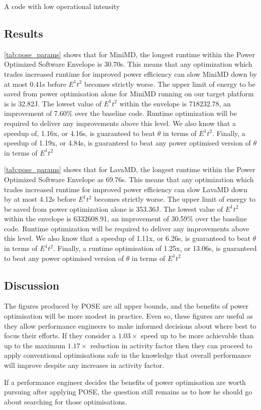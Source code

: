 A code with low operational intensity

\subsection{Results}

\autoref{tab:pose_params}  shows that for MiniMD, the longest runtime within the Power Optimized Software Envelope is 30.70s.
This means that any optimization which trades increased runtime for improved power efficiency can slow MiniMD down by at most 0.41s before $E^1t^2$ becomes strictly worse.
The upper limit of energy to be saved from power optimisation alone for MiniMD running on our target platform is is 32.82J.
The lowest value of $E^1t^2$ within the envelope is 718232.78, an improvement of 7.60\% over the baseline code.
Runtime optimization will be required to deliver any improvements above this level.
We also know that a speedup of, 1.16x, or 4.16s, is guaranteed to beat $\theta$ in terms of $E^1t^2$.
Finally, a speedup of 1.19x, or 4.84s, is guaranteed to beat any power optimised version of $\theta$ in terms of $E^1t^2$

\autoref{tab:pose_params}  shows that for LavaMD, the longest runtime within the Power Optimized Software Envelope as 69.76s.
This means that any optimization which trades increased runtime for improved power efficiency can slow LavaMD down by at most 4.12s before $E^1t^2$ becomes strictly worse.
The upper limit of energy to be saved from power optimization alone is 353.36J.
The lowest value of $E^1t^2$ within the envelope is 6332608.91, an improvement of 30.59\% over the baseline code.
Runtime optimization will be required to deliver any improvements above this level.
We also know that a speedup of 1.11x, or 6.26s, is guaranteed to beat $\theta$ in terms of $E^1t^2$.
Finally, a runtime optimisation of 1.25x, or 13.06s, is guaranteed to beat any power optimised version of $\theta$ in terms of $E^1t^2$

\subsection{Discussion}


The figures produced by POSE are all upper bounds, and the benefits of power optimisation will be more modest in practice. Even so, these figures are useful as they allow performance engineers to make informed decisions about where best to focus their efforts. If they consider a $1.03 \times$ speed up to be more achievable than up to the maximum $1.17\times$ reduction in activity factor then they can proceed to apply conventional optimisations safe in the knowledge that overall performance will improve despite any increases in activity factor.

If a performance engineer decides the benefits of power optimisation are worth pursuing after applying POSE, the question still remains as to how he should go about searching for those optimisations.
